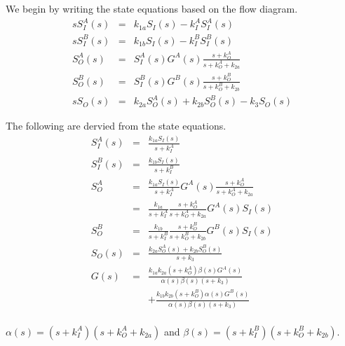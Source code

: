\documentclass[unnumsec,webpdf,contemporary,large]{oup-authoring-template}%
\theoremstyle{thmstyleone}%
\theoremstyle{thmstyletwo}%
\theoremstyle{thmstylethree}%
\begin{document}
We begin by writing the state equations based on the flow diagram.
   \begin{eqnarray}
   s S^A_I (s) & = & k_{1a} S_I(s) - k^A_I S^A_I (s) \nonumber \\
   s S^B_I (s) & = & k_{1b} S_I(s) - k^B_I S^B_I (s) \nonumber \\
   S^A_O (s) & = &  S^A_I (s) G^A(s) \frac{s + k^A_O}{s + k^A_O + k_{2a}} \nonumber \\
   S^B_O (s) & = & S^B_I (s)  G^B(s) \frac{s + k^B_O}{s + k^B_O + k_{2b}} \nonumber \\
   sS_O (s) & = & k_{2a} S^A_O(s) + k_{2b} S^B_O(s) - k_3 S_O(s)
   \end{eqnarray}

The following are dervied from the state equations.
\begin{eqnarray}
S^A_I(s) & = & \frac{k_{1a} S_I (s)}{s + k^A_I} \nonumber \\
S^B_I(s) & = & \frac{k_{1b} S_I (s)}{s + k^B_I} \nonumber \\
S^A_O & = & \frac{k_{1a} S_I (s)}{s + k^A_I} G^A(s) \frac{s + k^A_O}{s + k^A_O + k_{2a}} \nonumber\\
   & = & \frac{k_{1a}}{s + k^A_I} \frac{s + k^A_O}{s + k^A_O + k_{2a}}  G^A(s) S_I (s) \nonumber \\
S^B_O
   & = & \frac{k_{1b}}{s + k^B_I} \frac{s + k^B_O}{s + k^B_O + k_{2b}}  G^B(s) S_I (s) \nonumber \\
S_O (s) & = & \frac{k_{2a} S^A_O(s) + k_{2b} S^B_O(s) }{s + k_3} \nonumber \\
G(s) & = & \frac{k_{1a} k_{2a} (s + k^A_O) \beta(s) G^A(s) }{\alpha(s) \beta(s) (s + k_3)} \nonumber \\
& & +  \frac{k_{1b}  k_{2b} (s + k^B_O)\alpha(s) G^B(s) }{\alpha(s) \beta(s) (s + k_3)} \\
\end{eqnarray}

$\alpha(s) = (s + k^A_I) (s + k^A_O + k_{2a})$ and
$\beta(s) = (s + k^B_I) (s + k^B_O + k_{2b})$.

\end{document}
